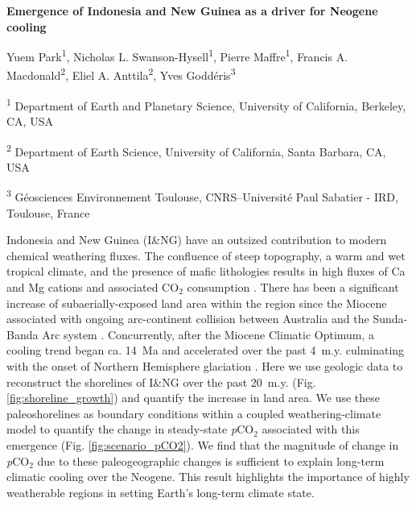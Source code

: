 \documentclass[11pt,letterpaper]{article}
\newcommand{\pCOtwo}{\textit{p}CO$_{2}$\xspace}
\newcommand{\COtwo}{CO$_{2}$\xspace}
\begin{document}
\begin{flushleft}
{\Large \textbf{Emergence of Indonesia and New Guinea as a driver for Neogene cooling}}

Yuem Park\textsuperscript{1},
Nicholas L. Swanson-Hysell\textsuperscript{1},
Pierre Maffre\textsuperscript{1},
Francis A. Macdonald\textsuperscript{2},
Eliel A. Anttila\textsuperscript{2},
Yves Godd\'eris\textsuperscript{3}

\bigskip
\textsuperscript{1} Department of Earth and Planetary Science, University of California, Berkeley, CA, USA

\textsuperscript{2} Department of Earth Science, University of California, Santa Barbara, CA, USA

\textsuperscript{3} G\'eosciences Environnement Toulouse, CNRS--Universit\'e Paul Sabatier - IRD, Toulouse, France

\bigskip

\end{flushleft}

\linenumbers

Indonesia and New Guinea (I\&NG) have an outsized contribution to modern chemical weathering fluxes. The confluence of steep topography, a warm and wet tropical climate, and the presence of mafic lithologies results in high fluxes of Ca and Mg cations and associated \COtwo consumption \cite{Gaillardet1999a, Hartmann2009a, Milliman2013a, Hartmann2014a}. There has been a significant increase of subaerially-exposed land area within the region since the Miocene associated with ongoing arc-continent collision between Australia and the Sunda-Banda Arc system \cite{Molnar2015a, Hall2017a, Macdonald2019a}. Concurrently, after the Miocene Climatic Optimum, a cooling trend began ca. 14~Ma and accelerated over the past 4~m.y. culminating with the onset of Northern Hemisphere glaciation \cite{Shackleton1984a, Zachos2001a}. Here we use geologic data to reconstruct the shorelines of I\&NG over the past 20~m.y. (Fig. \ref{fig:shoreline_growth}) and quantify the increase in land area. We use these paleoshorelines as boundary conditions within a coupled weathering-climate model to quantify the change in steady-state \pCOtwo associated with this emergence (Fig. \ref{fig:scenario_pCO2}). We find that the magnitude of change in \pCOtwo due to these paleogeographic changes is sufficient to explain long-term climatic cooling over the Neogene. This result highlights the importance of highly weatherable regions in setting Earth's long-term climate state.
\end{document}
